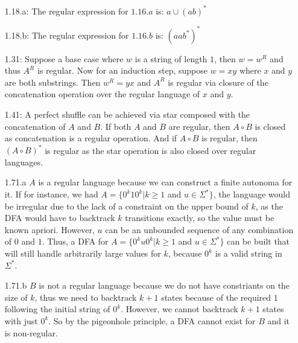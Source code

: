 \documentclass{article}
\begin{document}
\begin{itemize}
  \item[1.18.a:] The regular expression for $1.16.a$ is: $a\cup(ab)^*$
  \item[1.18.b:] The regular expression for $1.16.b$ is: $(aab^*)^*$
  \item[1.31:] Suppose a base case where $w$ is a string of length $1$, then $w = w^R$ and thus $A^R$ is regular.
    Now for an induction step, suppose $w = xy$ where $x$ and $y$ are both substrings. Then $w^R = yx$ and $A^R$ is regular via closure of the concatenation operation over the regular language of $x$ and $y$.
  \item[1.41:] A perfect shuffle can be achieved via star composed with the concatenation of $A$ and $B$. If both $A$ and $B$ are regular, then $A \circ B$ is closed as concatenation is a regular operation. And if $A \circ B$ is regular, then $(A \circ B)^*$ is regular as the star operation is also closed over regular languages.
  \item[1.71.a] $A$ is a regular language because we can construct a finite autonoma for it. If for instance, we had $A = \{0^k10^k|k\geq1$ and $u \in \Sigma^*\}$, the language would be irregular due to the lack of a constraint on the upper bound of $k$, as the DFA would have to backtrack $k$ transitions exactly, so the value must be known apriori. However, $u$ can be an unbounded sequence of any combination of $0$ and $1$. Thus, a DFA for $A = \{0^ku0^k|k\geq1$ and $u \in \Sigma^*\}$ can be built that will still handle arbitrarily large values for $k$, because $0^k$ is a valid string in $\Sigma^*$.
  \item[1.71.b] $B$ is not a regular language because we do not have constriants on the size of $k$, thus we need to backtrack $k+1$ states because of the required $1$ following the initial string of $0^k$. However, we cannot backtrack $k+1$ states with just $0^k$. So by the pigeonhole principle, a DFA cannot exist for $B$ and it is non-regular.
\end{itemize}
\end{document}
